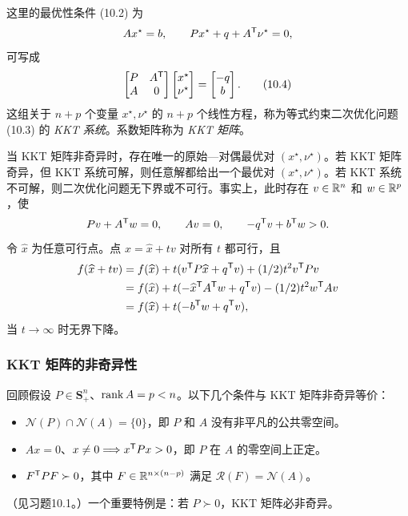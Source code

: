 这里的最优性条件 (10.2) 为
\[Ax^\star=b,\qquad Px^\star+q+A^\mathsf T\nu^\star=0,\]
可写成
\begin{equation}\begin{bmatrix}P&A^\mathsf T\\A&0\end{bmatrix}\begin{bmatrix}x^\star\\\nu^\star\end{bmatrix}=\begin{bmatrix}-q\\b\end{bmatrix}.\tag{10.4}\end{equation}
这组关于 $n+p$ 个变量 $x^\star,\nu^\star$ 的 $n+p$ 个线性方程，称为等式约束二次优化问题 (10.3) 的 \emph{KKT 系统}。系数矩阵称为 \emph{KKT 矩阵}。

当 KKT 矩阵非奇异时，存在唯一的原始—对偶最优对 $(x^\star,\nu^\star)$。若 KKT 矩阵奇异，但 KKT 系统可解，则任意解都给出一个最优对 $(x^\star,\nu^\star)$。若 KKT 系统不可解，则二次优化问题无下界或不可行。事实上，此时存在 $v\in\mathbb R^n$ 和 $w\in\mathbb R^p$，使
\[Pv+A^\mathsf T w=0,\qquad Av=0,\qquad-q^\mathsf T v+b^\mathsf T w>0.\]
令 $\widehat x$ 为任意可行点。点 $x=\widehat x+tv$ 对所有 $t$ 都可行，且
\[\begin{aligned}
f(\widehat x+tv)&=f(\widehat x)+t(v^\mathsf T P\widehat x+q^\mathsf T v)+(1/2)t^2v^\mathsf T Pv\\
&=f(\widehat x)+t(-\widehat x^\mathsf T A^\mathsf T w+q^\mathsf T v)-(1/2)t^2w^\mathsf T Av\\
&=f(\widehat x)+t(-b^\mathsf T w+q^\mathsf T v),
\end{aligned}\]
当 $t\to\infty$ 时无界下降。

\subsubsection*{KKT 矩阵的非奇异性}
回顾假设 $P\in\mathbf S_+^n$、$\operatorname{rank} A=p<n$。以下几个条件与 KKT 矩阵非奇异等价：
\begin{itemize}
\item $\mathcal N(P)\cap\mathcal N(A)=\{0\}$，即 $P$ 和 $A$ 没有非平凡的公共零空间。
\item $Ax=0$、$x\ne0\Longrightarrow x^\mathsf T Px>0$，即 $P$ 在 $A$ 的零空间上正定。
\item $F^\mathsf T PF\succ0$，其中 $F\in\mathbb R^{n\times(n-p)}$ 满足 $\mathcal R(F)=\mathcal N(A)$。
\end{itemize}
（见习题10.1。）一个重要特例是：若 $P\succ0$，KKT 矩阵必非奇异。

